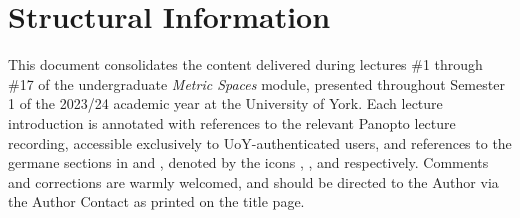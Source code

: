 \documentclass{article}
\newif\ifdraft
\numberwithin{equation}{section}
\numberwithin{figure}{section}
\begin{document}
\section*{Structural Information}

This document consolidates the content delivered during lectures \#1 through
\#17 of the undergraduate \emph{Metric Spaces} module, presented throughout
Semester 1 of the 2023/24 academic year at the University of York. Each lecture
introduction is annotated with references to the relevant Panopto lecture
recording, accessible exclusively to UoY-authenticated users, and references to
the germane sections in \autocite{Shirali:2006} and \autocite{Searcoid:2007},
denoted by the icons
,
, and
respectively. Comments and corrections are warmly welcomed, and should be
directed to the Author via the Author Contact as printed on the title page.

\begingroup
    \setlength\parskip{0pt}
    \tableofcontents
\endgroup
\ifdraft
\section*{Draft Copy Only: To-Do List}

In no particular order:
\par\begin{itemize}
    \item Finish lecture XI: add diagrams to continuity definitions;
    \item Fix page boundaries/trailing under-filled vertical boxes;
    \item Add Shirali and S\&V book references;
    \item Improve the length and prose style of lecture-introduction paragraphs;
    \item Lectures:
        \begin{itemize}
            \item XII;
            \item XIII;
            \item XIV;
            \item XV;
            \item XVI;
            \item XVII: \emph{end of examinable content}.
        \end{itemize}
\end{itemize}
\fi
\clearpage
{}
\pagestyle{mainbody}
\end{document}
